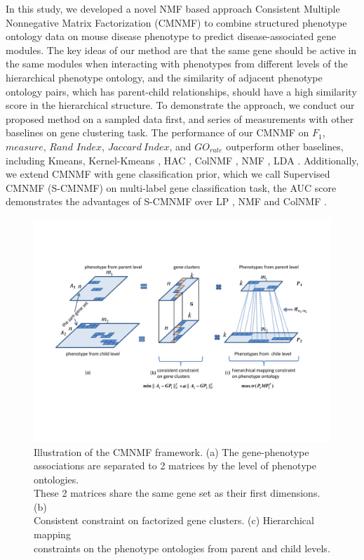 \documentclass{bmcart}
\begin{document}
In this study, we developed a novel NMF based approach Consistent Multiple Nonnegative Matrix Factorization (CMNMF) to combine structured phenotype ontology data on mouse disease phenotype to predict disease-associated gene modules. The key ideas of our method are that the same gene should be active in the same modules when interacting with phenotypes from different levels of the hierarchical phenotype ontology, and the similarity of adjacent phenotype ontology pairs, which has parent-child relationships, should have a high similarity score in the hierarchical structure. To demonstrate the approach, we conduct our proposed method on a sampled data first, and series of measurements with other baselines on gene clustering task. The performance of our CMNMF on $F_1$, $measure$, $Rand$ $Index$, $Jaccard\ Index$, and $GO_{rate}$ outperform other baselines, including Kmeans, Kernel-Kmeans \cite{Dhillon2004}, HAC \cite{Ward1963}, ColNMF \cite{Singh2008}, NMF \cite{Lee1999}, LDA \cite{Blei2003}. Additionally, we extend CMNMF with gene classification prior, which we call Supervised CMNMF (S-CMNMF) on multi-label gene classification task, the AUC score demonstrates the advantages of S-CMNMF over LP \cite{Raghavan2007}, NMF and ColNMF \cite{Singh2008}.
\begin{figure}[!t]
  \centering
  \begin{minipage}{.80\linewidth}
  \centering
    \includegraphics[width=\linewidth]{DrawPictures/module2.pdf}
  \end{minipage}
  \caption{Illustration of the CMNMF framework. (a) The gene-phenotype \\ associations are separated to 2 matrices by the level of phenotype ontologies. \\These 2 matrices share the same gene set as their first dimensions. (b)\\ Consistent constraint on factorized gene clusters. (c) Hierarchical mapping \\ constraints on the phenotype ontologies from parent and child levels.}
  \label{fig:model}
\end{figure}
\end{document}
